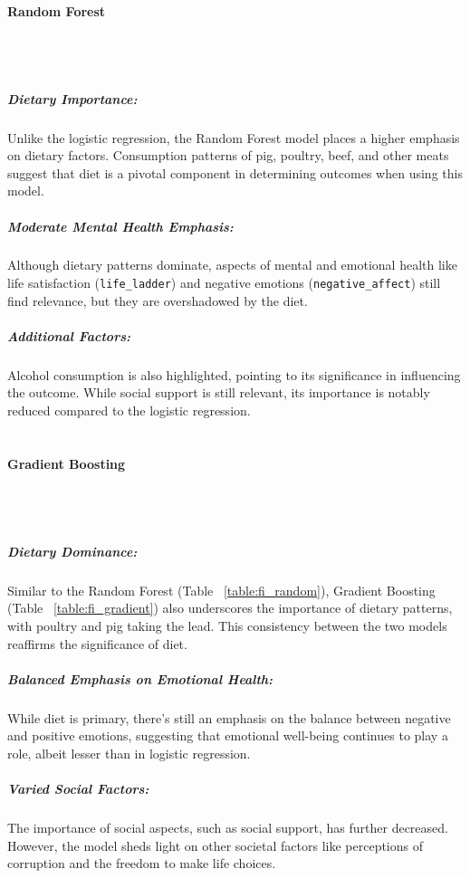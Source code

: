 	\paragraph{Random Forest}
		\\
		\\

		\subparagraph{Dietary Importance:} Unlike the logistic regression, the Random Forest model places a higher
			emphasis on dietary factors. Consumption patterns of pig, poultry, beef, and other meats suggest that
			diet is
			a pivotal component in determining outcomes when using this model.

		\subparagraph{Moderate Mental Health Emphasis:} Although dietary patterns dominate, aspects of mental and
			emotional
			health like life satisfaction (\texttt{life\_ladder}) and negative emotions (\texttt{negative\_affect})
			still
			find relevance, but they are overshadowed by the diet.

		\subparagraph{Additional Factors:} Alcohol consumption is also highlighted, pointing to its significance in
			influencing the outcome. While social support is still relevant, its importance is notably reduced
			compared to
			the logistic regression.
			\\
			\\

	\paragraph{Gradient Boosting}
		\\
		\\

		\subparagraph{Dietary Dominance:} Similar to the Random Forest (Table ~\ref{table:fi_random}), Gradient
			Boosting
			(Table ~\ref{table:fi_gradient}) also underscores the importance of dietary patterns, with poultry and pig
			taking the lead. This consistency between the two models reaffirms the significance of diet.

		\subparagraph{Balanced Emphasis on Emotional Health:} While diet is primary, there's still an emphasis on the
			balance between negative and positive emotions, suggesting that emotional well-being continues to play a
			role,
			albeit lesser than in logistic regression.

		\subparagraph{Varied Social Factors:} The importance of social aspects, such as social support, has further
			decreased. However, the model sheds light on other societal factors like perceptions of corruption and the
			freedom to make life choices.

